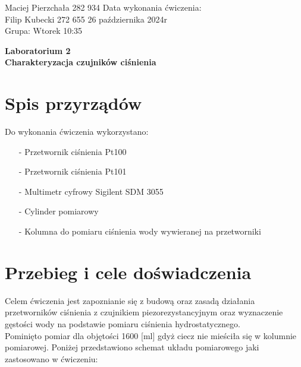 \documentclass[11pt]{article}
\begin{document}
\begin{flushleft}
        Maciej Pierzchała 282 934 \hfill Data wykonania ćwiczenia:\\
        Filip Kubecki 272 655 \hfill 26 października 2024r\\
        Grupa: Wtorek 10:35 \\
    \end{flushleft}

    \begin{center}
        \Large\textbf{Laboratorium 2}\\
        \textbf{Charakteryzacja czujników ciśnienia}
    \end{center}
    \hfill
    \section{Spis przyrządów}
    \par{
        Do wykonania ćwiczenia wykorzystano:
        \begin{itemize}
            \setlength\itemsep{0em}
            \item[-] Przetwornik ciśnienia Pt100
            \item[-] Przetwornik ciśnienia Pt101
            \item[-] Multimetr cyfrowy Sigilent SDM 3055
            \item[-] Cylinder pomiarowy
            \item[-] Kolumna do pomiaru ciśnienia wody wywieranej na przetworniki
        \end{itemize}
    }
    \section{Przebieg i cele doświadczenia}
    \par Celem ćwiczenia jest zapoznianie się z budową oraz zasadą działania przetworników ciśnienia z czujnikiem piezorezystancyjnym
    oraz wyznaczenie gęstości wody na podstawie pomiaru ciśnienia hydrostatycznego.\\
    \indent Pominięto pomiar dla objętości 1600 [ml] gdyż ciecz nie mieściła się w kolumnie pomiarowej. Poniżej przedstawiono schemat układu pomiarowego jaki zastosowano w ćwiczeniu:\\
    \noindent{}
\end{document}
